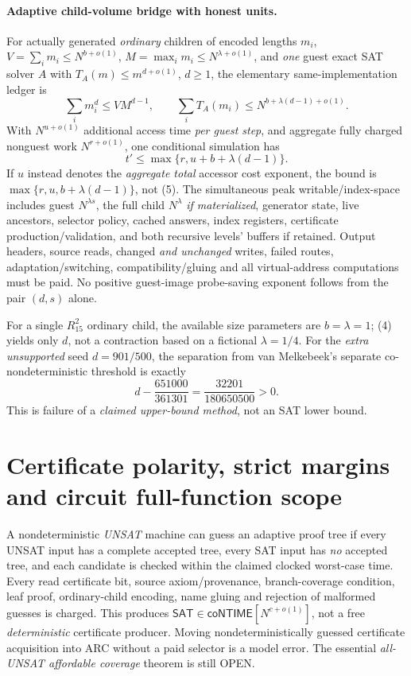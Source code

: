 \documentclass[11pt]{article}
\newcommand{\SAT}{\mathsf{SAT}}
\begin{document}
\paragraph{Adaptive child-volume bridge with honest units.}
For actually generated \emph{ordinary} children of encoded lengths $m_i$,
$V=\sum_i m_i\le N^{b+o(1)}$, $M=\max_i m_i\le N^{\lambda+o(1)}$,
and \emph{one} guest exact SAT solver $A$ with $T_A(m)\le m^{d+o(1)}$,
$d\ge1$, the elementary same-implementation ledger is
\[
\sum_i m_i^d\le V M^{d-1},\qquad
\sum_i T_A(m_i)\le N^{b+\lambda(d-1)+o(1)}.
\tag{4}
\]
With $N^{u+o(1)}$ additional access time \emph{per guest step}, and
aggregate fully charged nonguest work $N^{r+o(1)}$, one conditional
simulation has
\[
t'\le\max\{r,u+b+\lambda(d-1)\}.
\tag{5}
\]
If $u$ instead denotes the \emph{aggregate total} accessor cost exponent,
the bound is $\max\{r,u,b+\lambda(d-1)\}$, not (5).
The simultaneous peak writable/index-space includes guest $N^{\lambda s}$,
the full child $N^\lambda$ \emph{if materialized}, generator state,
live ancestors, selector policy, cached answers, index registers,
certificate production/validation, and both recursive levels' buffers
if retained. Output headers, source reads, changed \emph{and unchanged}
writes, failed routes, adaptation/switching, compatibility/gluing and
all virtual-address computations must be paid. No positive guest-image
probe-saving exponent follows from the pair $(d,s)$ alone.

For a single $R_{15}^2$ ordinary child, the available size
parameters are $b=\lambda=1$; (4) yields only $d$, not a contraction
based on a fictional $\lambda=1/4$. For the \emph{extra unsupported}
seed $d=901/500$, the separation from van Melkebeek's separate
co-nondeterministic threshold is exactly
\[
d-\frac{651000}{361301}=\frac{32201}{180650500}>0.
\]
This is failure of a \emph{claimed upper-bound method}, not an SAT lower bound.

\section{Certificate polarity, strict margins and circuit full-function scope}
A nondeterministic \emph{UNSAT} machine can guess an adaptive proof tree
if every UNSAT input has a complete accepted tree, every SAT input has
\emph{no} accepted tree, and each candidate is checked within the claimed
clocked worst-case time. Every read certificate bit, source axiom/provenance,
branch-coverage condition, leaf proof, ordinary-child encoding, name gluing
and rejection of malformed guesses is charged. This produces
$\SAT\in\mathsf{coNTIME}[N^{c+o(1)}]$, not a free \emph{deterministic}
certificate producer. Moving nondeterministically guessed certificate
acquisition into ARC without a paid selector is a model error.
The essential \emph{all-UNSAT affordable coverage} theorem is still OPEN.
\end{document}
